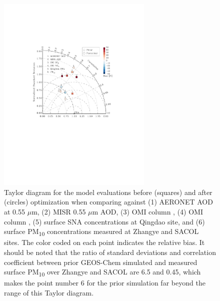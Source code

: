  \begin{figure}[h]
  \centering
  \includegraphics[width={0.66\textwidth}]{figures/a12.pdf} 
  \caption{Taylor diagram for the model evaluations before (squares) and after (circles) optimization when comparing against (1) AERONET AOD at 0.55 $\mu$m, (2) MISR 0.55 $\mu$m AOD, (3) OMI column , (4) OMI column , (5) surface SNA concentrations at Qingdao site, and (6) surface PM\textsubscript{10} concentrations measured at Zhangye and SACOL sites. The color coded on each point indicates the relative bias. It should be noted that the ratio of standard deviations and correlation coefficient between prior GEOS-Chem simulated and measured surface PM\textsubscript{10} over Zhangye and SACOL are 6.5 and 0.45, which makes the point number 6 for the prior simulation far beyond the range of this Taylor diagram. }
  \label{fig:taylor}
 \end{figure}


